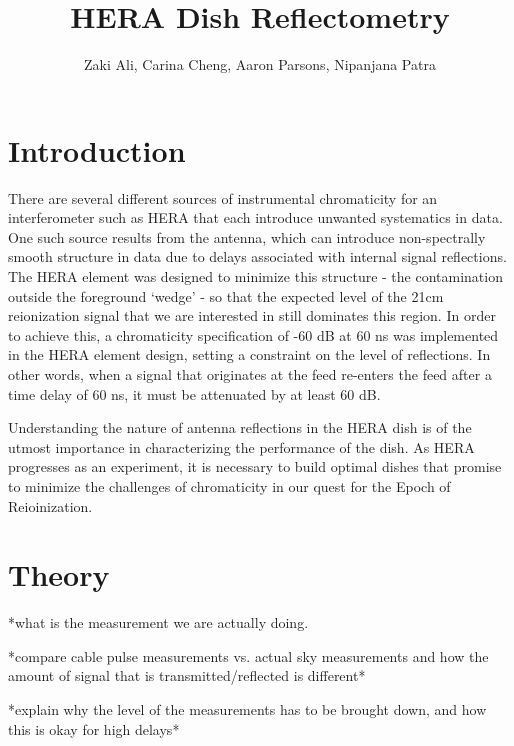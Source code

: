 \documentclass[12pt,preprint]{aastex}
\begin{document}
\title{HERA Dish Reflectometry} 
\author{Zaki Ali, Carina Cheng, Aaron Parsons, Nipanjana Patra}
\maketitle

\section{Introduction}

There are several different sources of instrumental chromaticity for an interferometer such as HERA that each introduce unwanted systematics in data. One such source results from the antenna, which can introduce non-spectrally smooth structure in data due to delays associated with internal signal reflections. The HERA element was designed to minimize this structure - the contamination outside the foreground `wedge' - so that the expected level of the 21cm reionization signal that we are interested in still dominates this region. In order to achieve this, a chromaticity specification of -60 dB at 60 ns was implemented in the HERA element design, setting a constraint on the level of reflections. In other words, when a signal that originates at the feed re-enters the feed after a time delay of 60 ns, it must be attenuated by at least 60 dB. 

Understanding the nature of antenna reflections in the HERA dish is of the utmost importance in characterizing the performance of the dish. As HERA progresses as an experiment, it is necessary to build optimal dishes that promise to minimize the challenges of chromaticity in our quest for the Epoch of Reioinization.
\section{Theory}

*what is the measurement we are actually doing. 

*compare cable pulse measurements vs. actual sky measurements and how the amount of signal that is transmitted/reflected is different*

*explain why the level of the measurements has to be brought down, and how this is okay for high delays*
\end{document}
